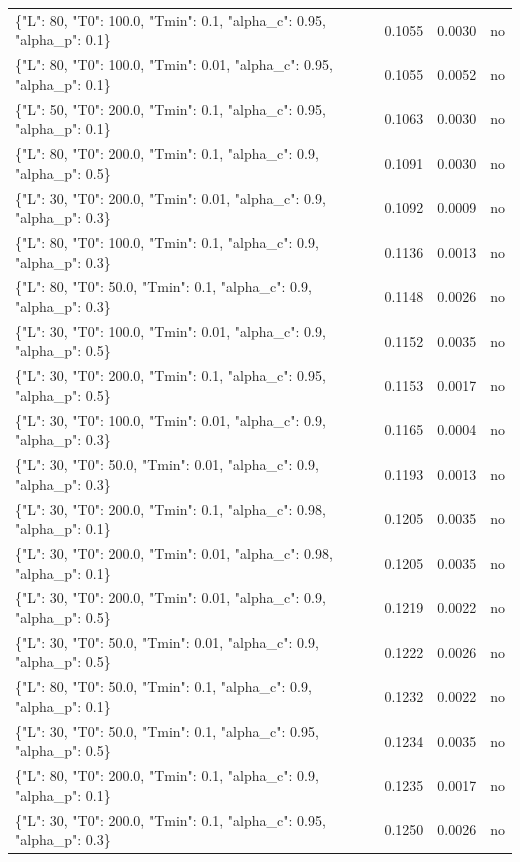 \begin{table}[htbp]
\begin{tabular}{lrrr}
\{"L": 80, "T0": 100.0, "Tmin": 0.1, "alpha\_c": 0.95, "alpha\_p": 0.1\} & 0.1055 & 0.0030 & no \\
\{"L": 80, "T0": 100.0, "Tmin": 0.01, "alpha\_c": 0.95, "alpha\_p": 0.1\} & 0.1055 & 0.0052 & no \\
\{"L": 50, "T0": 200.0, "Tmin": 0.1, "alpha\_c": 0.95, "alpha\_p": 0.1\} & 0.1063 & 0.0030 & no \\
\{"L": 80, "T0": 200.0, "Tmin": 0.1, "alpha\_c": 0.9, "alpha\_p": 0.5\} & 0.1091 & 0.0030 & no \\
\{"L": 30, "T0": 200.0, "Tmin": 0.01, "alpha\_c": 0.9, "alpha\_p": 0.3\} & 0.1092 & 0.0009 & no \\
\{"L": 80, "T0": 100.0, "Tmin": 0.1, "alpha\_c": 0.9, "alpha\_p": 0.3\} & 0.1136 & 0.0013 & no \\
\{"L": 80, "T0": 50.0, "Tmin": 0.1, "alpha\_c": 0.9, "alpha\_p": 0.3\} & 0.1148 & 0.0026 & no \\
\{"L": 30, "T0": 100.0, "Tmin": 0.01, "alpha\_c": 0.9, "alpha\_p": 0.5\} & 0.1152 & 0.0035 & no \\
\{"L": 30, "T0": 200.0, "Tmin": 0.1, "alpha\_c": 0.95, "alpha\_p": 0.5\} & 0.1153 & 0.0017 & no \\
\{"L": 30, "T0": 100.0, "Tmin": 0.01, "alpha\_c": 0.9, "alpha\_p": 0.3\} & 0.1165 & 0.0004 & no \\
\{"L": 30, "T0": 50.0, "Tmin": 0.01, "alpha\_c": 0.9, "alpha\_p": 0.3\} & 0.1193 & 0.0013 & no \\
\{"L": 30, "T0": 200.0, "Tmin": 0.1, "alpha\_c": 0.98, "alpha\_p": 0.1\} & 0.1205 & 0.0035 & no \\
\{"L": 30, "T0": 200.0, "Tmin": 0.01, "alpha\_c": 0.98, "alpha\_p": 0.1\} & 0.1205 & 0.0035 & no \\
\{"L": 30, "T0": 200.0, "Tmin": 0.01, "alpha\_c": 0.9, "alpha\_p": 0.5\} & 0.1219 & 0.0022 & no \\
\{"L": 30, "T0": 50.0, "Tmin": 0.01, "alpha\_c": 0.9, "alpha\_p": 0.5\} & 0.1222 & 0.0026 & no \\
\{"L": 80, "T0": 50.0, "Tmin": 0.1, "alpha\_c": 0.9, "alpha\_p": 0.1\} & 0.1232 & 0.0022 & no \\
\{"L": 30, "T0": 50.0, "Tmin": 0.1, "alpha\_c": 0.95, "alpha\_p": 0.5\} & 0.1234 & 0.0035 & no \\
\{"L": 80, "T0": 200.0, "Tmin": 0.1, "alpha\_c": 0.9, "alpha\_p": 0.1\} & 0.1235 & 0.0017 & no \\
\{"L": 30, "T0": 200.0, "Tmin": 0.1, "alpha\_c": 0.95, "alpha\_p": 0.3\} & 0.1250 & 0.0026 & no \\

\end{tabular}
\end{table}
